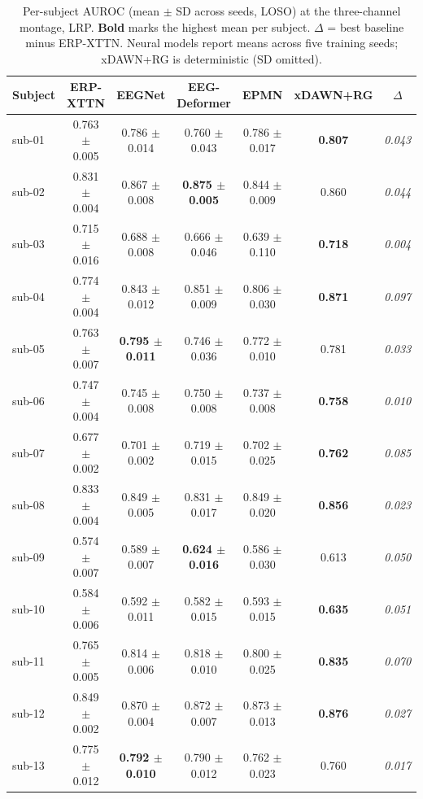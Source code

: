 \begin{table}[t]
\centering
\caption{Per-subject AUROC (mean $\pm$ SD across seeds, LOSO) at the three-channel montage, LRP. \textbf{Bold} marks the highest mean per subject. $\Delta$ = best baseline minus ERP-XTTN. Neural models report means across five training seeds; xDAWN+RG is deterministic (SD omitted).}
\label{sup:tab-persubj-lrp}
\begin{tabular}{lcccccc}
\toprule
Subject & ERP-XTTN & EEGNet & EEG-Deformer & EPMN & xDAWN+RG & $\Delta$ \\
\midrule
sub-01 & 0.763 $\pm$ 0.005 & 0.786 $\pm$ 0.014 & 0.760 $\pm$ 0.043 & 0.786 $\pm$ 0.017 & \textbf{0.807} & \textit{0.043} \\
sub-02 & 0.831 $\pm$ 0.004 & 0.867 $\pm$ 0.008 & \textbf{0.875 $\pm$ 0.005} & 0.844 $\pm$ 0.009 & 0.860 & \textit{0.044} \\
sub-03 & 0.715 $\pm$ 0.016 & 0.688 $\pm$ 0.008 & 0.666 $\pm$ 0.046 & 0.639 $\pm$ 0.110 & \textbf{0.718} & \textit{0.004} \\
sub-04 & 0.774 $\pm$ 0.004 & 0.843 $\pm$ 0.012 & 0.851 $\pm$ 0.009 & 0.806 $\pm$ 0.030 & \textbf{0.871} & \textit{0.097} \\
sub-05 & 0.763 $\pm$ 0.007 & \textbf{0.795 $\pm$ 0.011} & 0.746 $\pm$ 0.036 & 0.772 $\pm$ 0.010 & 0.781 & \textit{0.033} \\
sub-06 & 0.747 $\pm$ 0.004 & 0.745 $\pm$ 0.008 & 0.750 $\pm$ 0.008 & 0.737 $\pm$ 0.008 & \textbf{0.758} & \textit{0.010} \\
sub-07 & 0.677 $\pm$ 0.002 & 0.701 $\pm$ 0.002 & 0.719 $\pm$ 0.015 & 0.702 $\pm$ 0.025 & \textbf{0.762} & \textit{0.085} \\
sub-08 & 0.833 $\pm$ 0.004 & 0.849 $\pm$ 0.005 & 0.831 $\pm$ 0.017 & 0.849 $\pm$ 0.020 & \textbf{0.856} & \textit{0.023} \\
sub-09 & 0.574 $\pm$ 0.007 & 0.589 $\pm$ 0.007 & \textbf{0.624 $\pm$ 0.016} & 0.586 $\pm$ 0.030 & 0.613 & \textit{0.050} \\
sub-10 & 0.584 $\pm$ 0.006 & 0.592 $\pm$ 0.011 & 0.582 $\pm$ 0.015 & 0.593 $\pm$ 0.015 & \textbf{0.635} & \textit{0.051} \\
sub-11 & 0.765 $\pm$ 0.005 & 0.814 $\pm$ 0.006 & 0.818 $\pm$ 0.010 & 0.800 $\pm$ 0.025 & \textbf{0.835} & \textit{0.070} \\
sub-12 & 0.849 $\pm$ 0.002 & 0.870 $\pm$ 0.004 & 0.872 $\pm$ 0.007 & 0.873 $\pm$ 0.013 & \textbf{0.876} & \textit{0.027} \\
sub-13 & 0.775 $\pm$ 0.012 & \textbf{0.792 $\pm$ 0.010} & 0.790 $\pm$ 0.012 & 0.762 $\pm$ 0.023 & 0.760 & \textit{0.017} \\

\end{tabular}
\end{table}
